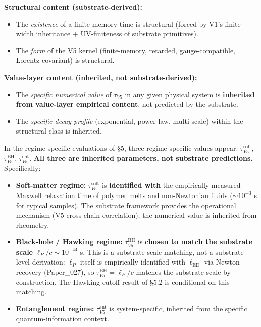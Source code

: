 \documentclass[11pt,a4paper]{article}
\begin{document}
\textbf{Structural content (substrate-derived):}

\begin{itemize}[noitemsep]
\item The \emph{existence} of a finite memory time is structural (forced by V1's finite-width inheritance + UV-finiteness of substrate primitives).
\item The \emph{form} of the V5 kernel (finite-memory, retarded, gauge-compatible, Lorentz-covariant) is structural.
\end{itemize}

\textbf{Value-layer content (inherited, not substrate-derived):}

\begin{itemize}[noitemsep]
\item The \emph{specific numerical value} of $\tau_{V5}$ in any given physical system is \textbf{inherited from value-layer empirical content}, not predicted by the substrate.
\item The \emph{specific decay profile} (exponential, power-law, multi-scale) within the structural class is inherited.
\end{itemize}

In the regime-specific evaluations of \S5, three regime-specific values appear: $\tau_{V5}^\mathrm{soft}$, $\tau_{V5}^\mathrm{BH}$, $\tau_{V5}^\mathrm{ent}$. \textbf{All three are inherited parameters, not substrate predictions.} Specifically:

\begin{itemize}[noitemsep]
\item \textbf{Soft-matter regime:} $\tau_{V5}^\mathrm{soft}$ is \textbf{identified with} the empirically-measured Maxwell relaxation time of polymer melts and non-Newtonian fluids ($\sim 10^{-3}$ s for typical samples). The substrate framework provides the operational mechanism (V5 cross-chain correlation); the numerical value is inherited from rheometry.
\item \textbf{Black-hole / Hawking regime:} $\tau_{V5}^\mathrm{BH}$ is \textbf{chosen to match the substrate scale} $\ell_P/c \sim 10^{-44}$ s. This is a substrate-scale matching, not a substrate-level derivation: $\ell_P$ itself is empirically identified with $\ell_\mathrm{ED}$ via Newton-recovery (Paper\_027), so $\tau_{V5}^\mathrm{BH} = \ell_P/c$ matches the substrate scale by construction. The Hawking-cutoff result of \S5.2 is conditional on this matching.
\item \textbf{Entanglement regime:} $\tau_{V5}^\mathrm{ent}$ is system-specific, inherited from the specific quantum-information context.
\end{itemize}
\end{document}

